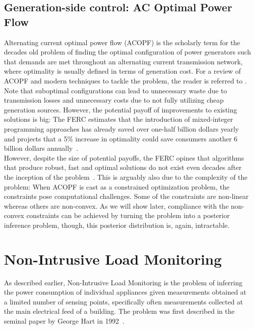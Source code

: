 \documentclass[11pt]{cmuthesis} %
\begin{document}
\subsection{Generation-side control: AC Optimal Power Flow}
Alternating current optimal power flow (ACOPF) is the scholarly term for the decades old problem of finding the optimal configuration of power generators such that demands are met throughout an alternating current transmission network, where optimality is usually defined in terms of generation cost. For a review of ACOPF and modern techniques to tackle the problem, the reader is referred to \cite{ferc2012history,capitanescu2016critical}. Note that suboptimal configurations can lead to unnecessary waste due to transmission losses and unnecessary costs due to not fully utilizing cheap generation sources. However, the potential payoff of improvements to existing solutions is big: The FERC estimates that the introduction of mixed-integer programming approaches has already saved over one-half billion dollars yearly and projects that a 5\% increase in optimality could save consumers another 6 billion dollars annually~\cite{ferc2012history}.\\
However, despite the size of potential payoffs, the FERC opines that algorithms that produce robust, fast and optimal solutions do not exist even decades after the inception of the problem~\cite{ferc2012history}. This is arguably also due to the complexity of the problem: When ACOPF is cast as a constrained optimization problem, the constraints pose computational challenges. Some of the constraints are non-linear whereas others are non-convex. As we will show later, compliance with the non-convex constraints can be achieved by turning the problem into a posterior inference problem, though, this posterior distribution is, again, intractable.



\section{Non-Intrusive Load Monitoring}

As described earlier, Non-Intrusive Load Monitoring is the problem of inferring the power consumption of individual appliances given measurements obtained at a limited number of sensing points, specifically often measurements collected at the main electrical feed of a building. The problem was first described in the seminal paper by George Hart in 1992~\cite{hart1992nonintrusive}. 
\end{document}
